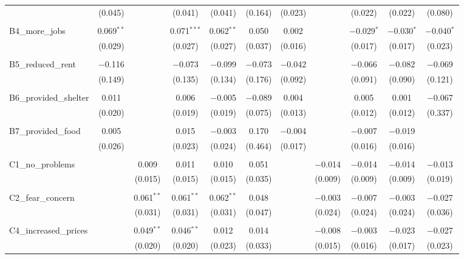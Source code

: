 \begin{table}[H]
\begin{tabular}{@{\extracolsep{4pt}}lcccccccccc}
  & (0.045) &  & (0.041) & (0.041) & (0.164) & (0.023) &  & (0.022) & (0.022) & (0.080) \\ 
  & & & & & & & & & & \\ 
 B4\_more\_jobs & 0.069$^{**}$ &  & 0.071$^{***}$ & 0.062$^{**}$ & 0.050 & 0.002 &  & $-$0.029$^{*}$ & $-$0.030$^{*}$ & $-$0.040$^{*}$ \\ 
  & (0.029) &  & (0.027) & (0.027) & (0.037) & (0.016) &  & (0.017) & (0.017) & (0.023) \\ 
  & & & & & & & & & & \\ 
 B5\_reduced\_rent & $-$0.116 &  & $-$0.073 & $-$0.099 & $-$0.073 & $-$0.042 &  & $-$0.066 & $-$0.082 & $-$0.069 \\ 
  & (0.149) &  & (0.135) & (0.134) & (0.176) & (0.092) &  & (0.091) & (0.090) & (0.121) \\ 
  & & & & & & & & & & \\ 
 B6\_provided\_shelter & 0.011 &  & 0.006 & $-$0.005 & $-$0.089 & 0.004 &  & 0.005 & 0.001 & $-$0.067 \\ 
  & (0.020) &  & (0.019) & (0.019) & (0.075) & (0.013) &  & (0.012) & (0.012) & (0.337) \\ 
  & & & & & & & & & & \\ 
 B7\_provided\_food & 0.005 &  & 0.015 & $-$0.003 & 0.170 & $-$0.004 &  & $-$0.007 & $-$0.019 &  \\ 
  & (0.026) &  & (0.023) & (0.024) & (0.464) & (0.017) &  & (0.016) & (0.016) &  \\ 
  & & & & & & & & & & \\ 
 C1\_no\_problems &  & 0.009 & 0.011 & 0.010 & 0.051 &  & $-$0.014 & $-$0.014 & $-$0.014 & $-$0.013 \\ 
  &  & (0.015) & (0.015) & (0.015) & (0.035) &  & (0.009) & (0.009) & (0.009) & (0.019) \\ 
  & & & & & & & & & & \\ 
 C2\_fear\_concern &  & 0.061$^{**}$ & 0.061$^{**}$ & 0.062$^{**}$ & 0.048 &  & $-$0.003 & $-$0.007 & $-$0.003 & $-$0.027 \\ 
  &  & (0.031) & (0.031) & (0.031) & (0.047) &  & (0.024) & (0.024) & (0.024) & (0.036) \\ 
  & & & & & & & & & & \\ 
 C4\_increased\_prices &  & 0.049$^{**}$ & 0.046$^{**}$ & 0.012 & 0.014 &  & $-$0.008 & $-$0.003 & $-$0.023 & $-$0.027 \\ 
  &  & (0.020) & (0.020) & (0.023) & (0.033) &  & (0.015) & (0.016) & (0.017) & (0.023) \\ 

\end{tabular}
\end{table}
